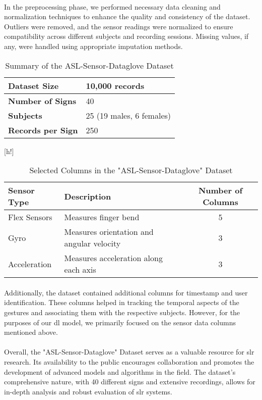 \paragraph{}
In the preprocessing phase, we performed necessary data cleaning and normalization techniques to enhance the quality and consistency of the dataset. Outliers were removed, and the sensor readings were normalized to ensure compatibility across different subjects and recording sessions. Missing values, if any, were handled using appropriate imputation methods.
\begin{table}[h!]
	\centering
	\caption{Summary of the ASL-Sensor-Dataglove Dataset}
	\label{tab:dataset-summary}
	\begin{tabular}{|l|l|}
		\hline
		\textbf{Dataset Size} & 10,000 records \\
		\hline
		\textbf{Number of Signs} & 40 \\
		\hline
		\textbf{Subjects} & 25 (19 males, 6 females) \\
		\hline
		\textbf{Records per Sign} & 250 \\
		\hline
	\end{tabular}
\end{table}[h!]
\begin{table}
	\centering
	\caption{Selected Columns in the "ASL-Sensor-Dataglove" Dataset}
	\label{tab:column-used}
	\begin{tabular}{|l|l|c|}
		\hline
		\textbf{Sensor Type} & \textbf{Description} & \textbf{Number of Columns} \\
		\hline
		Flex Sensors & Measures finger bend & 5 \\
		\hline
		Gyro & Measures orientation and angular velocity & 3 \\
		\hline
		Acceleration & Measures acceleration along each axis & 3 \\
		\hline
	\end{tabular}
\end{table}
\paragraph{}
Additionally, the dataset contained additional columns for timestamp and user identification. These columns helped in tracking the temporal aspects of the gestures and associating them with the respective subjects. However, for the purposes of our \ac{dl} model, we primarily focused on the sensor data columns mentioned above.
\paragraph{}
Overall, the "ASL-Sensor-Dataglove" Dataset serves as a valuable resource for \ac{slr} research. Its availability to the public encourages collaboration and promotes the development of advanced models and algorithms in the field. The dataset's comprehensive nature, with 40 different signs and extensive recordings, allows for in-depth analysis and robust evaluation of \ac{slr} systems.